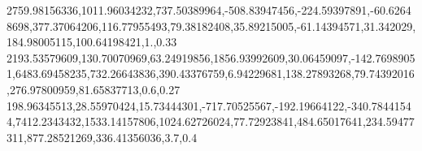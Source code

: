 2759.98156336,1011.96034232,737.50389964,-508.83947456,-224.59397891,-60.62648698,377.37064206,116.77955493,79.38182408,35.89215005,-61.14394571,31.342029,184.98005115,100.64198421,1.,0.33
2193.53579609,130.70070969,63.24919856,1856.93992609,30.06459097,-142.76989051,6483.69458235,732.26643836,390.43376759,6.94229681,138.27893268,79.74392016,276.97800959,81.65837713,0.6,0.27
198.96345513,28.55970424,15.73444301,-717.70525567,-192.19664122,-340.78441544,7412.2343432,1533.14157806,1024.62726024,77.72923841,484.65017641,234.59477311,877.28521269,336.41356036,3.7,0.4

